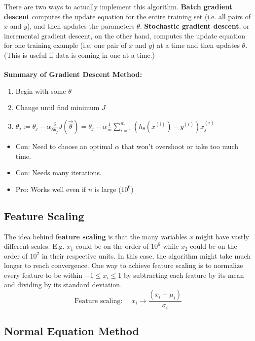 \documentclass[letterpaper,10pt]{article}
\begin{document}
There are two ways to actually implement this algorithm. \textbf{Batch gradient descent} computes the update equation for the entire training set (i.e. all pairs of $x$ and $y$), and then updates the parameters $\theta$. \textbf{Stochastic gradient descent}, or incremental gradient descent, on the other hand, computes the update equation for one training example (i.e. one pair of $x$ and $y$) at a time and then updates $\theta$. (This is useful if data is coming in one at a time.)\\\\
{\bf Summary of Gradient Descent Method:}
	\begin{enumerate}
	\item Begin with some $\theta$
	\item Change until find minimum $J$
	\item $\theta_j := \theta_j - \alpha \frac{\partial}{\partial \theta_j} J(\vec \theta) = \theta_j - \alpha \frac{1}{m} \sum_{i=1}^m \left( h_{\theta}(x^{(i)}) - y^{(i)}  \right) x_j^{(i)}$
	\end{enumerate}
	\begin{itemize}
	\item Con: Need to choose an optimal $\alpha$ that won't overshoot or take too much time.
	\item Con: Needs many iterations.
	\item Pro: Works well even if $n$ is large ($10^6$)
	\end{itemize}
	
\subsection{Feature Scaling} The idea behind \textbf{feature scaling} is that the many variables $x$ might have vastly different scales. E.g. $x_1$ could be on the order of $10^6$ while $x_2$ could be on the order of $10^2$ in their respective units. In this case, the algorithm might take much longer to reach convergence. One way to achieve feature scaling is to normalize every feature to be within $-1\leq x_i \leq 1$ by subtracting each feature by its mean and dividing by its standard deviation.
\begin{equation}
\text{Feature scaling: }\quad x_i \rightarrow \frac{(x_i-\mu_i)}{\sigma_i}\label{EqnNormalization}
\end{equation}




\subsection{Normal Equation Method}
\end{document}
